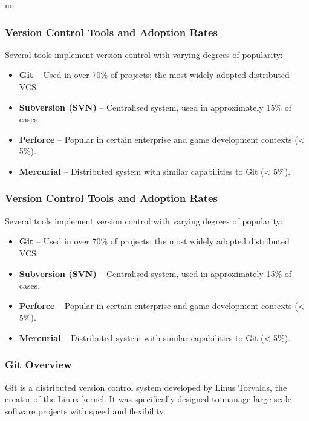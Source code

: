 no\documentclass{article}
\begin{document}
\subsubsection{Version Control Tools and Adoption Rates}

Several tools implement version control with varying degrees of popularity:

\begin{itemize}
    \item \textbf{Git} – Used in over 70\% of projects; the most widely adopted distributed VCS.
    \item \textbf{Subversion (SVN)} – Centralised system, used in approximately 15\% of cases.
    \item \textbf{Perforce} – Popular in certain enterprise and game development contexts (< 5\%).
    \item \textbf{Mercurial} – Distributed system with similar capabilities to Git (< 5\%).
\end{itemize}


\subsubsection{Version Control Tools and Adoption Rates}

Several tools implement version control with varying degrees of popularity:

\begin{itemize}
    \item \textbf{Git} – Used in over 70\% of projects; the most widely adopted distributed VCS.
    \item \textbf{Subversion (SVN)} – Centralised system, used in approximately 15\% of cases.
    \item \textbf{Perforce} – Popular in certain enterprise and game development contexts (< 5\%).
    \item \textbf{Mercurial} – Distributed system with similar capabilities to Git (< 5\%).
\end{itemize}

\subsubsection{Git Overview}

Git is a distributed version control system developed by Linus Torvalds, the creator of the Linux kernel. It was specifically designed to manage large-scale software projects with speed and flexibility.
\end{document}
